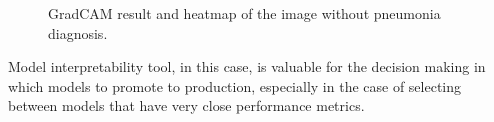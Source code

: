 \begin{figure}[H]%
    \centering
    \qquad
    \caption{GradCAM result and heatmap of the image without pneumonia diagnosis.}%
    \label{fig:camnormal}%
\end{figure}

Model interpretability tool, in this case, is valuable for the decision making in which models to promote to production, especially in the case of selecting between models that have very close performance metrics.

